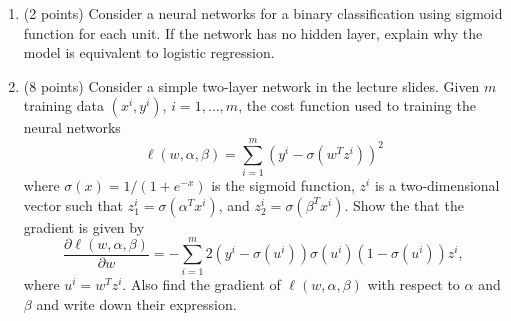 \documentclass[twoside,10pt]{article}
\begin{document}
\begin{enumerate}
\begin{enumerate}
\item (2 points)
Consider a neural networks for a binary classification using sigmoid function for each unit. If the network has no hidden layer, explain why the model is equivalent to logistic regression. 
\item (8 points) 
Consider a simple two-layer network in the lecture slides. Given $m$ training data $(x^i, y^i)$, $i = 1, \ldots, m$, the cost function used to training the neural networks
\[
\ell(w, \alpha, \beta) = \sum_{i=1}^m (y^i - \sigma(w^T z^i))^2
\]
where $\sigma (x) = 1/(1+e^{-x})$ is the sigmoid function, $z^i$ is a two-dimensional vector such that  $z_1^i = \sigma(\alpha^T x^i)$, and $z_2^i = \sigma(\beta^T x^i)$. Show the that the gradient is given by
\[
\frac{\partial \ell(w, \alpha, \beta) }{\partial w}
= - \sum_{i=1}^m 2(y^i - \sigma(u^i))\sigma(u^i)(1-\sigma(u^i)) z^i,
\]
where $u^i = w^T z^i$. Also find the gradient of $\ell(w, \alpha, \beta)$ with respect to $\alpha$ and $\beta$ and write down their expression.
\end{enumerate}


\end{enumerate}
\end{document}
